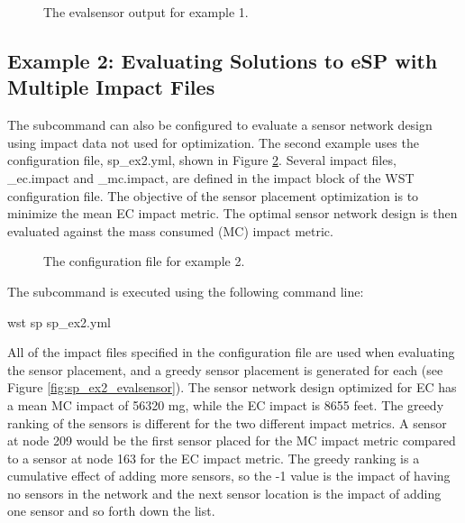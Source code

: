 \begin{figure}[h]
  \caption{The evalsensor output for  example 1.}
  \label{fig:sp_ex1_evalsensor}
\end{figure}

\FloatBarrier 
\subsection{Example 2: Evaluating Solutions to eSP with Multiple Impact Files}
\label{sp_example2}

The  subcommand can also be configured to evaluate a sensor network design using
impact data not used for optimization. The second example uses the configuration 
file, sp\_ex2.yml, shown in Figure \ref{fig:sp_ex2}. Several impact files, 
{\outputprefix}\_ec.impact and {\outputprefix}\_mc.impact, are defined in the 
impact block of the WST configuration file. The objective of the sensor placement 
optimization is to minimize the mean EC impact metric. The optimal sensor 
network design is then evaluated against the mass consumed (MC) impact metric.

\begin{figure}[h]
  \caption{The  configuration file for example 2.}
  \label{fig:sp_ex2}
\end{figure}

The  subcommand is executed using the following command line:

\begin{unknownListing}
wst sp sp_ex2.yml
\end{unknownListing}

All of the impact files specified in the configuration file are
used when evaluating the sensor placement, and a greedy sensor
placement is generated for each (see Figure \ref{fig:sp_ex2_evalsensor}).
The sensor network design optimized for EC has a mean MC
impact of 56320 mg, while the EC impact is 8655 feet. 
The greedy ranking of the sensors is different for
the two different impact metrics. A sensor at node 209 would be the
first sensor placed for the MC impact metric compared to a sensor
at node 163 for the EC impact metric. The greedy ranking is a cumulative 
effect of adding more sensors, so the -1 value is the impact of having no 
sensors in the network and the next sensor location is the impact of adding 
one sensor and so forth down the list.

